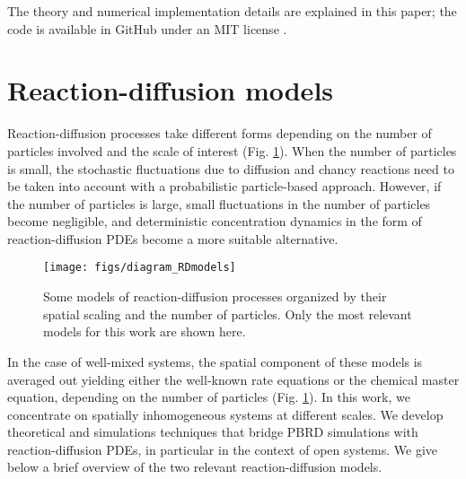 \documentclass[10pt,twocolumn]{revtex4-1}
\begin{document}
	The theory and numerical implementation details are explained in this paper;
	the code is available in GitHub under an MIT license \cite{kostre2020GitHub}.
	
	\section{Reaction-diffusion models}\label{sec:RDM}
	
	Reaction-diffusion processes take different forms depending on the number of particles involved and the scale of interest (Fig. \ref{fig:diagRDmodels}). When the number of particles is small, the stochastic fluctuations due to diffusion and chancy reactions need to be taken into account with a probabilistic particle-based approach. However, if the number of particles is large, small fluctuations in the number of particles become negligible, and deterministic concentration dynamics in the form of reaction-diffusion PDEs become a more suitable alternative. 
	
	\begin{figure}[htb]
		\center
		\texttt{[image: figs/diagram\_RDmodels]}
		\caption{Some models of reaction-diffusion processes organized by their spatial
			scaling and the number of particles. Only the most relevant models for this work are shown here.}
		\label{fig:diagRDmodels}
	\end{figure}
	
	In the case of well-mixed systems, the spatial component of these models is averaged out yielding either the well-known rate equations or the chemical master equation, depending on the number of particles (Fig. \ref{fig:diagRDmodels}). In this work, we concentrate on spatially inhomogeneous systems at different scales. We develop theoretical and simulations techniques that bridge PBRD simulations with reaction-diffusion PDEs, in particular in the context of open systems. We give below a brief overview of the two relevant reaction-diffusion models.
	
\end{document}
